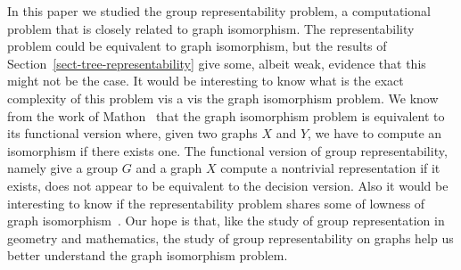 \documentclass[a4paper,11pt]{article}
\begin{document}
In this paper we studied the group representability problem, a
computational problem that is closely related to graph
isomorphism. The representability problem could be equivalent to graph
isomorphism, but the results of
Section~\ref{sect-tree-representability} give some, albeit weak,
evidence that this might not be the case. It would be interesting to
know what is the exact complexity of this problem vis a vis the graph
isomorphism problem. We know from the work of
Mathon~\cite{mathon79note} that the graph isomorphism problem is
equivalent to its functional version where, given two graphs $X$ and
$Y$, we have to compute an isomorphism if there exists one. The
functional version of group representability, namely give a group $G$
and a graph $X$ compute a nontrivial representation if it exists, does
not appear to be equivalent to the decision version. Also it would be
interesting to know if the representability problem shares some of
lowness of graph
isomorphism~\cite{schoning87graph,kobler92graph,arvind2002graph}.  Our
hope is that, like the study of group representation in geometry and
mathematics, the study of group representability on graphs help us
better understand the graph isomorphism problem.



\end{document}
